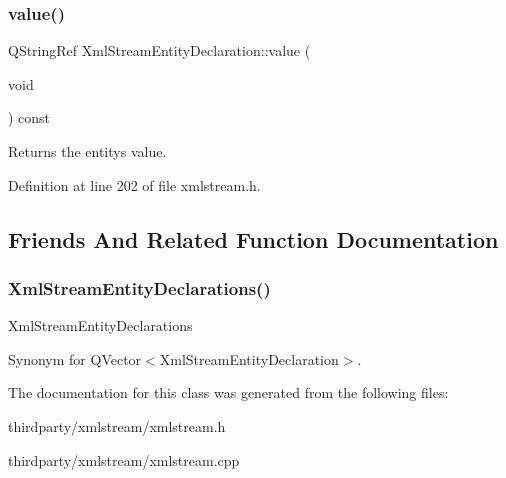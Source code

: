 \subsubsection{\texorpdfstring{value()}{value()}}
{\footnotesize\ttfamily Q\+String\+Ref Xml\+Stream\+Entity\+Declaration\+::value (\begin{DoxyParamCaption}\item[{void}]{ }\end{DoxyParamCaption}) const\hspace{0.3cm}{\ttfamily [inline]}}

Returns the entity\textquotesingle{}s value. 

Definition at line 202 of file xmlstream.\+h.



\subsection{Friends And Related Function Documentation}
\mbox{\label{class_xml_stream_entity_declaration_a49950c9d3e6d666bc5516775fe3a8d80}} 
\subsubsection{\texorpdfstring{Xml\+Stream\+Entity\+Declarations()}{XmlStreamEntityDeclarations()}}
{\footnotesize\ttfamily Xml\+Stream\+Entity\+Declarations\hspace{0.3cm}{\ttfamily [related]}}

Synonym for Q\+Vector$<$\+Xml\+Stream\+Entity\+Declaration$>$. 

The documentation for this class was generated from the following files\+:\begin{DoxyCompactItemize}
\item 
thirdparty/xmlstream/xmlstream.\+h\item 
thirdparty/xmlstream/xmlstream.\+cpp\end{DoxyCompactItemize}
